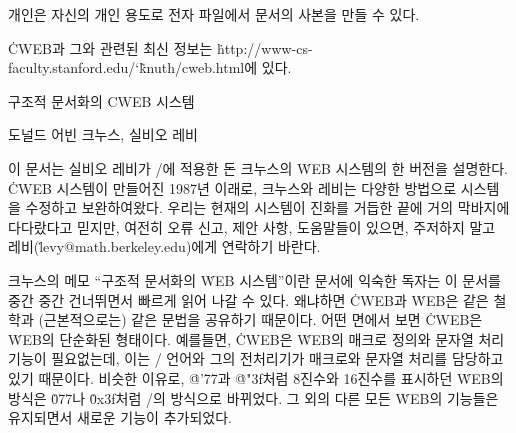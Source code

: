 \smallskip\noindent
개인은 자신의 개인 용도로 전자 파일에서 문서의 사본을 만들 수 있다.

\smallskip\noindent
\.{CWEB}과 그와 관련된 최신 정보는 
\.{http://www-cs-faculty.stanford.edu/\char`\~knuth/cweb.html}에 있다.

 \titletrue\eject

\titletrue
\centerline{\titlefont 구조적 문서화의 {\ttitlefont CWEB} 시스템}

\centerline{도널드 어빈 크누스, 실비오 레비}

\noindent
이 문서는 실비오 레비가 \CEE/에 적용한 돈 크누스의 \.{WEB} 시스템의 한 버전을
설명한다. \.{CWEB} 시스템이 만들어진 1987년 이래로, 크누스와 레비는 다양한
방법으로 시스템을 수정하고 보완하여왔다. 우리는 현재의 시스템이 진화를 거듭한
끝에 거의 막바지에 다다랐다고 믿지만, 여전히 오류 신고, 제안 사항, 도움말들이
있으면, 주저하지 말고 레비(\.{levy@math.berkeley.edu})에게 연락하기 바란다.

크누스의 메모 ``구조적 문서화의 \.{WEB} 시스템''이란 문서에 익숙한 독자는 이
문서를 중간 중간 건너뛰면서 빠르게 읽어 나갈 수 있다. 왜냐하면  \.{CWEB}과
\.{WEB}은 같은 철학과 (근본적으로는) 같은 문법을 공유하기 때문이다. 어떤 면에서
보면 \.{CWEB}은 \.{WEB}의 단순화된 형태이다. 예를들면, \.{CWEB}은 \.{WEB}의
매크로 정의와 문자열 처리 기능이 필요없는데, 이는 \CEE/ 언어와 그의 전처리기가
매크로와 문자열 처리를 담당하고 있기 때문이다.
비슷한 이유로, \.{@'77}과 \.{@"3f}처럼 8진수와 16진수를 표시하던  \.{WEB}의 방식은
\.{077}나 \.{0x3f}처럼 \CEE/의 방식으로 바뀌었다.
그 외의 다른 모든 \.{WEB}의 기능들은 유지되면서 새로운 기능이 추가되었다.

